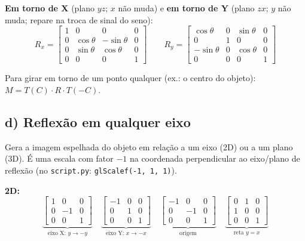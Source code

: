 \documentclass{article}
\begin{document}
\textbf{Em torno de X} (plano $yz$; $x$ não muda) e \textbf{em torno de Y} (plano $zx$; $y$ não muda; repare na troca de sinal do seno):
\[
      R_x =
      \begin{bmatrix}
            1 & 0          & 0           & 0 \\
            0 & \cos\theta & -\sin\theta & 0 \\
            0 & \sin\theta & \cos\theta  & 0 \\
            0 & 0          & 0           & 1
      \end{bmatrix}
      \qquad
      R_y =
      \begin{bmatrix}
            \cos\theta  & 0 & \sin\theta & 0 \\
            0           & 1 & 0          & 0 \\
            -\sin\theta & 0 & \cos\theta & 0 \\
            0           & 0 & 0          & 1
      \end{bmatrix}
\]

Para girar em torno de um ponto qualquer (ex.: o centro do objeto): $M = T(C) \cdot R \cdot T(-C)$.

\subsection*{d) Reflexão em qualquer eixo}

Gera a imagem espelhada do objeto em relação a um eixo (2D) ou a um plano (3D). É uma escala com fator $-1$ na coordenada perpendicular ao eixo/plano de reflexão (no \texttt{script.py}: \texttt{glScalef(-1, 1, 1)}).

\textbf{2D:}
\[
      \underbrace{\begin{bmatrix} 1 & 0 & 0 \\ 0 & -1 & 0 \\ 0 & 0 & 1 \end{bmatrix}}_{\text{eixo X: } y \to -y}
      \quad
      \underbrace{\begin{bmatrix} -1 & 0 & 0 \\ 0 & 1 & 0 \\ 0 & 0 & 1 \end{bmatrix}}_{\text{eixo Y: } x \to -x}
      \quad
      \underbrace{\begin{bmatrix} -1 & 0 & 0 \\ 0 & -1 & 0 \\ 0 & 0 & 1 \end{bmatrix}}_{\text{origem}}
      \quad
      \underbrace{\begin{bmatrix} 0 & 1 & 0 \\ 1 & 0 & 0 \\ 0 & 0 & 1 \end{bmatrix}}_{\text{reta } y = x}
\]
\end{document}

